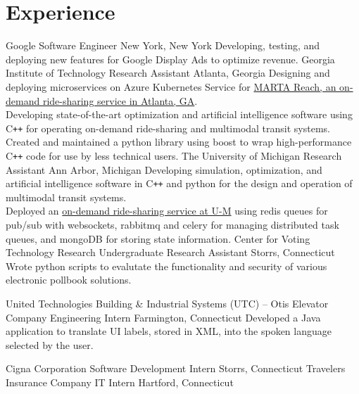 \section{Experience}
		{Google}
		{Software Engineer}
		{New York, New York}{}
		{Developing, testing, and deploying new features for Google Display Ads to optimize revenue.}
		{Georgia Institute of Technology}
		{Research Assistant}
		{Atlanta, Georgia}{}
		{Designing and deploying microservices on Azure Kubernetes Service for \href{https://www.itsmarta.com/reach.aspx}{MARTA Reach, an on-demand ride-sharing service in Atlanta, GA}. \\
        Developing state-of-the-art optimization and artificial intelligence software using C\texttt{++} for operating on-demand ride-sharing and multimodal transit systems. \\
        Created and maintained a python library using boost to wrap high-performance C\texttt{++} code for use by less technical users.}
		{The University of Michigan}
		{Research Assistant}
		{Ann Arbor, Michigan}{}
		{Developing simulation, optimization, and artificial intelligence software in C\texttt{++} and python for the design and operation of multimodal transit systems. \\
		Deployed an \href{https://record.umich.edu/articles/north-campus-first-test-site-hybrid-transportation-system/}{on-demand ride-sharing service at U-M} using redis queues for pub/sub with websockets, rabbitmq and celery for managing distributed task queues, and mongoDB for storing state information.}
		{Center for Voting Technology Research}
		{Undergraduate Research Assistant}
		{Storrs, Connecticut}{}
        {Wrote python scripts to evalutate the functionality and security of various electronic pollbook solutions.}

		{United Technologies Building \& Industrial Systems (UTC) -- Otis Elevator Company}
		{Engineering Intern}
		{Farmington, Connecticut}{}
		{Developed a Java application to translate UI labels, stored in XML, into the spoken language selected by the user.}

		{Cigna Corporation}
		{Software Development Intern}
		{Storrs, Connecticut}{}
        {}
		{Travelers Insurance Company}
		{IT Intern}
		{Hartford, Connecticut}{}
        {}
